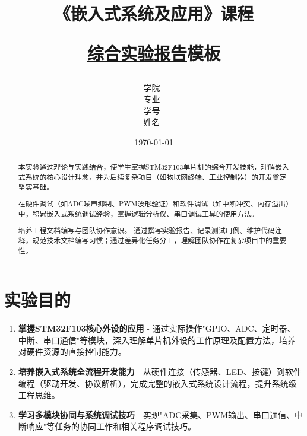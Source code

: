 \documentclass[12pt,hyperref,a4paper,twoside,UTF8]{ctexart}
\title{ 
        \vspace{1cm}
        \heiti \Huge \textbf{《嵌入式系统及应用》课程} \par
        \vspace{1cm} 
        \heiti \Large {\underline{综合实验报告}模板}    
        \vspace{3cm}
    }
\author{
        \vspace{0.5cm}
        \kaishu\Large 学院\ \dlmu[9cm]{仪器科学与光电工程学院} \\ %
        \vspace{0.5cm}
        \kaishu\Large 专业\ \dlmu[9cm]{光电信息工程} \\ %
        \vspace{0.5cm}
        \kaishu\Large 学号\ \dlmu[9cm]{2024XXXXXX} \qquad  \\ %
        \vspace{0.5cm}
        \kaishu\Large 姓名\ \dlmu[9cm]{XXX} \qquad \\ %
    }
\date{\today} %
\begin{document}
\cover
\thispagestyle{empty} %
\newpage
\begin{abstract}

本实验通过理论与实践结合，使学生掌握STM32F103单片机的综合开发技能，理解嵌入式系统的核心设计理念，并为后续复杂项目（如物联网终端、工业控制器）的开发奠定坚实基础。

在硬件调试（如ADC噪声抑制、PWM波形验证）和软件调试（如中断冲突、内存溢出）中，积累嵌入式系统调试经验，掌握逻辑分析仪、串口调试工具的使用方法。

培养工程文档编写与团队协作意识。  通过撰写实验报告、记录测试用例、维护代码注释，规范技术文档编写习惯；通过差异化任务分工，理解团队协作在复杂项目中的重要性。

\end{abstract}

\thispagestyle{empty} %

\newpage
\tableofcontents

\newpage
\setcounter{page}{1} %


\section{实验目的}


\begin{enumerate}[label=\roman*.]


\item \textbf{掌握STM32F103核心外设的应用}   - 通过实际操作"GPIO、ADC、定时器、中断、串口通信"等模块，深入理解单片机外设的工作原理及配置方法，培养对硬件资源的直接控制能力。

\item \textbf{培养嵌入式系统全流程开发能力}   - 从硬件连接（传感器、LED、按键）到软件编程（驱动开发、协议解析），完成完整的嵌入式系统设计流程，提升系统级工程思维。

\item \textbf{学习多模块协同与系统调试技巧}    - 实现"ADC采集、PWM输出、串口通信、中断响应"等任务的协同工作和相关程序调试技巧。


\end{enumerate}
\end{document}
